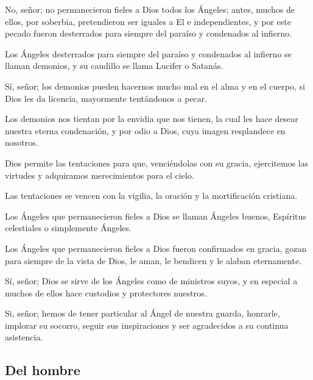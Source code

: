  No, señor; no
permanecieron fieles a Dios todos los Ángeles; antes, muchos de ellos, por
soberbia, pretendieron ser iguales a El e independientes, y por este pecado fueron
desterrados para siempre del paraíso y condenados al infierno.

 Los Ángeles desterrados para siempre del paraíso y
condenados al infierno se llaman demonios, y su caudillo se llama Lucifer o
Satanás.

 Sí, señor; los demonios
pueden hacernos mucho mal en el alma y en el cuerpo, si Dios les da licencia,
mayormente tentándonos a pecar.

 Los demonios nos tientan por la envidia que nos
tienen, la cual les hace desear nuestra eterna condenación, y por odio a Dios, cuya
imagen resplandece en nosotros.

 Dios permite las tentaciones
para que, venciéndolas con su gracia, ejercitemos las virtudes y adquiramos
merecimientos para el cielo.

 Las tentaciones se vencen con la
vigilia, la oración y la mortificación cristiana.

 Los
Ángeles que permanecieron fieles a Dios se llaman Ángeles buenos, Espíritus
celestiales o simplemente Ángeles.

 Los Ángeles
que permanecieron fieles a Dios fueron confirmados en gracia, gozan para
siempre de la vista de Dios, le aman, le bendicen y le alaban eternamente.

 Sí, señor; Dios
se sirve de los Ángeles como de ministros suyos, y en especial a muchos de ellos
hace custodios y protectores nuestros.

 Si,
señor; hemos de tener particular al Ángel de nuestra guarda, honrarle, implorar su
socorro, seguir sus inspiraciones y ser agradecidos a su continua asistencia.

\subsection{Del hombre}

